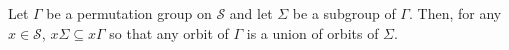 Let $\Gamma$ be a permutation group on $\mathcal{S}$ and let $\Sigma$ be a subgroup of $\Gamma$. Then, for any $x \in \mathcal{S}$, $x\Sigma \subseteq x\Gamma$ so that any orbit of $\Gamma$ is a union of orbits of $\Sigma$.
